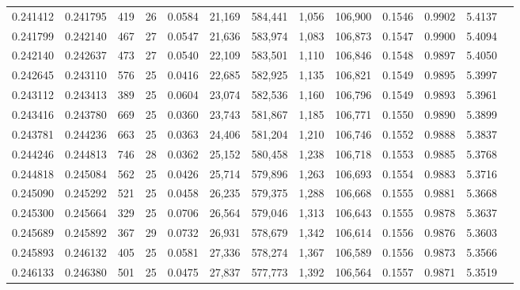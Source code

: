 \begin{tabular}{rrrrrrrrrrrrr}
0.241412 & 0.241795 & 419 &  26 &                                     0.0584 &  21,169 & 584,441 &   1,056 & 106,900 & 0.1546 & 0.9902 & 5.4137 \\
0.241799 & 0.242140 & 467 &  27 &                                     0.0547 &  21,636 & 583,974 &   1,083 & 106,873 & 0.1547 & 0.9900 & 5.4094 \\
0.242140 & 0.242637 & 473 &  27 &                                     0.0540 &  22,109 & 583,501 &   1,110 & 106,846 & 0.1548 & 0.9897 & 5.4050 \\
0.242645 & 0.243110 & 576 &  25 &                                     0.0416 &  22,685 & 582,925 &   1,135 & 106,821 & 0.1549 & 0.9895 & 5.3997 \\
0.243112 & 0.243413 & 389 &  25 &                                     0.0604 &  23,074 & 582,536 &   1,160 & 106,796 & 0.1549 & 0.9893 & 5.3961 \\
0.243416 & 0.243780 & 669 &  25 &                                     0.0360 &  23,743 & 581,867 &   1,185 & 106,771 & 0.1550 & 0.9890 & 5.3899 \\
0.243781 & 0.244236 & 663 &  25 &                                     0.0363 &  24,406 & 581,204 &   1,210 & 106,746 & 0.1552 & 0.9888 & 5.3837 \\
0.244246 & 0.244813 & 746 &  28 &                                     0.0362 &  25,152 & 580,458 &   1,238 & 106,718 & 0.1553 & 0.9885 & 5.3768 \\
0.244818 & 0.245084 & 562 &  25 &                                     0.0426 &  25,714 & 579,896 &   1,263 & 106,693 & 0.1554 & 0.9883 & 5.3716 \\
0.245090 & 0.245292 & 521 &  25 &                                     0.0458 &  26,235 & 579,375 &   1,288 & 106,668 & 0.1555 & 0.9881 & 5.3668 \\
0.245300 & 0.245664 & 329 &  25 &                                     0.0706 &  26,564 & 579,046 &   1,313 & 106,643 & 0.1555 & 0.9878 & 5.3637 \\
0.245689 & 0.245892 & 367 &  29 &                                     0.0732 &  26,931 & 578,679 &   1,342 & 106,614 & 0.1556 & 0.9876 & 5.3603 \\
0.245893 & 0.246132 & 405 &  25 &                                     0.0581 &  27,336 & 578,274 &   1,367 & 106,589 & 0.1556 & 0.9873 & 5.3566 \\
0.246133 & 0.246380 & 501 &  25 &                                     0.0475 &  27,837 & 577,773 &   1,392 & 106,564 & 0.1557 & 0.9871 & 5.3519 \\

\end{tabular}
